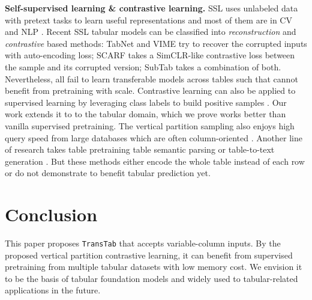\textbf{Self-supervised learning \& contrastive learning.} SSL uses unlabeled data with pretext tasks to learn useful representations and most of them are in CV and NLP \cite{devlin2018bert,bao2021beit,he2021masked,dosovitskiy2020image,gao2021simcse,vaswani2017attention,kenton2019bert,tsai2019multimodal,akbari2021vatt,lepikhin2020gshard,fedus2021switch}. Recent SSL tabular models can be classified into \textit{reconstruction} and \textit{contrastive} based methods: TabNet \cite{arik2021tabnet} and VIME \cite{yoon2020vime} try to recover the corrupted inputs with auto-encoding loss; SCARF \cite{bahri2022scarf} takes a SimCLR-like \cite{chen2020simple} contrastive loss between the sample and its corrupted version; SubTab \cite{ucar2021subtab} takes a combination of both. Nevertheless, all fail to learn transferable models across tables such that cannot benefit from pretraining with scale. Contrastive learning can also be applied to supervised learning by leveraging class labels to build positive samples \cite{khosla2020supervised}. Our work extends it to to the tabular domain, which we prove works better than vanilla supervised pretraining. The vertical partition sampling also enjoys high query speed from large databases which are often column-oriented \cite{stonebraker2018c}. Another line of research takes table pretraining table semantic parsing \cite{yin2020tabert,iida2021tabbie,lin2020bridging,deng2021turl,yang2022tableformer} or table-to-text generation \cite{wang2021retrieving,wang2022robust}. But these methods either encode the whole table instead of each row or do not demonstrate to benefit tabular prediction yet.

\section{Conclusion}
This paper proposes \texttt{TransTab} that accepts variable-column inputs. By the proposed vertical partition contrastive learning, it can benefit from supervised pretraining from multiple tabular datasets with low memory cost. We envision it to be the basis of tabular foundation models and widely used to tabular-related applications in the future. 



